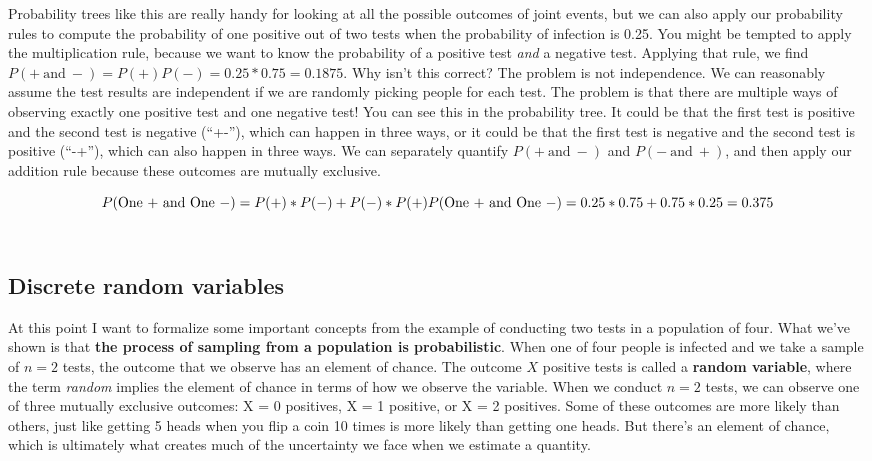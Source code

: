 \documentclass[
]{book}
\begin{document}
Probability trees like this are really handy for looking at all the possible outcomes of joint events, but we can also apply our probability rules to compute the probability of one positive out of two tests when the probability of infection is 0.25. You might be tempted to apply the multiplication rule, because we want to know the probability of a positive test \emph{and} a negative test. Applying that rule, we find \(P(+\ \text{and}\ -) = P(+)P(-) = 0.25*0.75=0.1875\). Why isn't this correct? The problem is not independence. We can reasonably assume the test results are independent if we are randomly picking people for each test. The problem is that there are multiple ways of observing exactly one positive test and one negative test! You can see this in the probability tree. It could be that the first test is positive and the second test is negative (``+-''), which can happen in three ways, or it could be that the first test is negative and the second test is positive (``-+''), which can also happen in three ways. We can separately quantify \(P(+\ \text{and}\ -)\) and \(P(-\ \text{and}\ +)\), and then apply our addition rule because these outcomes are mutually exclusive.

\[
P(\text{One +}\ \text{and}\ \text{One}\ - ) = P(+)*P(-) + P(-)*P(+)\\
P(\text{One +}\ \text{and}\ \text{One}\ - ) = 0.25*0.75 + 0.75*0.25=0.375
\]\\

\subsection{Discrete random variables}\label{discrete-random-variables}

At this point I want to formalize some important concepts from the example of conducting two tests in a population of four. What we've shown is that \textbf{the process of sampling from a population is probabilistic}. When one of four people is infected and we take a sample of \(n = 2\) tests, the outcome that we observe has an element of chance. The outcome \(X\) positive tests is called a \textbf{random variable}, where the term \emph{random} implies the element of chance in terms of how we observe the variable. When we conduct \(n=2\) tests, we can observe one of three mutually exclusive outcomes: X = 0 positives, X = 1 positive, or X = 2 positives. Some of these outcomes are more likely than others, just like getting 5 heads when you flip a coin 10 times is more likely than getting one heads. But there's an element of chance, which is ultimately what creates much of the uncertainty we face when we estimate a quantity.
\end{document}
